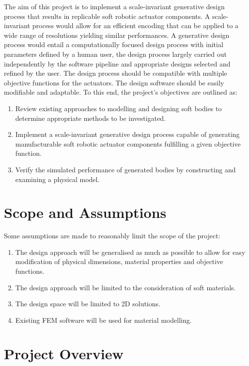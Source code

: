 The aim of this project is to implement a scale-invariant generative design process that results in replicable soft robotic actuator components. A scale-invariant process would allow for an efficient encoding that can be applied to a wide range of resolutions yielding similar performances. A generative design process would entail a computationally focused design process with initial parameters defined by a human user, the design process largely carried out independently by the software pipeline and appropriate designs selected and refined by the user. The design process should be compatible with multiple objective functions for the actuators. The design software should be easily modifiable and adaptable. To this end, the project's objectives are outlined as:

\begin{enumerate}
	\item Review existing approaches to modelling and designing soft bodies to determine appropriate methods to be investigated.
	\item Implement a scale-invariant generative design process capable of generating manufacturable soft robotic actuator components fulfilling a given objective function.
	\item Verify the simulated performance of generated bodies by constructing and examining a physical model.
\end{enumerate}

\section{Scope and Assumptions}
\label{sec:SaA}

Some assumptions are made to reasonably limit the scope of the project:

\begin{enumerate}
	\item The design approach will be generalised as much as possible to allow for easy modification of physical dimensions, material properties and objective functions.
	\item The design approach will be limited to the consideration of soft materials.
	\item The design space will be limited to 2D solutions.
	\item Existing FEM software will be used for material modelling.
\end{enumerate}

\section{Project Overview}


